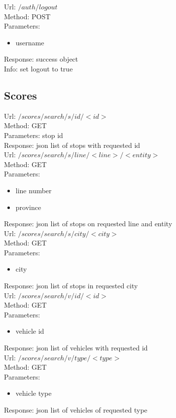 \documentclass[12pt,a4paper]{article}
\begin{document}
Url: $/auth/logout$\\
Method: POST\\
Parameters: \begin{itemize}
\item username
\end{itemize}
Response: success object\\
Info: set logout to true\\

\subsection{Scores}
Url: $/scores/search/s/id/<id>$\\
Method: GET\\
Parameters: stop id\\
Response: json list of stops with requested id\\

Url: $/scores/search/s/line/<line>/<entity>$\\
Method: GET\\
Parameters:\begin{itemize}
\item line number
\item province
\end{itemize}
Response: json list of stops on requested line and entity\\

Url: $/scores/search/s/city/<city>$\\
Method: GET\\
Parameters:\begin{itemize}
\item city
\end{itemize}
Response: json list of stops in requested city\\

Url: $/scores/search/v/id/<id>$\\
Method: GET\\
Parameters:\begin{itemize}
\item vehicle id
\end{itemize}
Response: json list of vehicles with requested id\\

Url: $/scores/search/v/type/<type>$\\
Method: GET\\
Parameters:\begin{itemize}
\item vehicle type
\end{itemize}
Response: json list of vehicles of requested type\\
\end{document}
